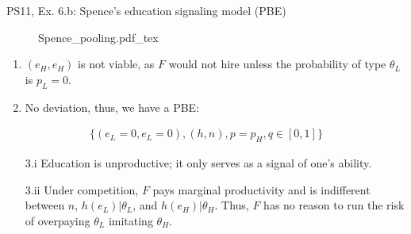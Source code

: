 \begin{frame}{PS11, Ex. 6.b: Spence’s education signaling model (PBE)}
\begin{multicols}{2}
\begin{figure}[!h]
        \center{}
        {Spence_pooling.pdf_tex}
      \end{figure}\vspace{-6pt}
      \begin{enumerate}
        \item $(e_H,e_H)$ is not viable, as $F$ would not hire unless the probability of type $\theta_L$ is $p_L=0$.
        \item \vspace{-2pt} No deviation, thus, we have a PBE:
      \end{enumerate}\vspace{-14pt}
      \begin{align*}
        \{(e_L=0,e_L=0),(h,n),p=p_H,q\in[0,1]\}
      \end{align*}\vspace{-24pt}
      \begin{itemize}
        \item[3.i] Education is unproductive; it only serves as a signal of one's ability.
        \item[3.ii] \vspace{-4pt} Under competition, $F$ pays marginal productivity and is indifferent between $n$, $h(e_L)|\theta_L$, and $h(e_H)|\theta_H$. Thus, $F$ has no reason to run the risk of overpaying $\theta_L$ imitating $\theta_H$.
      \end{itemize}
      \vfill\null
    \end{multicols}
\end{frame}
